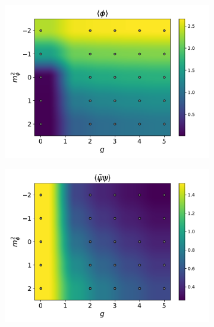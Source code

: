\begin{figure}[htp]
    \centering
    \begin{subfigure}[b]{0.47\textwidth}
        \includegraphics[width=\textwidth]{figures/phase_diagram/g-m/phase_diagram_phi.pdf}
    \end{subfigure}
    \begin{subfigure}[b]{0.47\textwidth}
        \includegraphics[width=\textwidth]{figures/phase_diagram/g-m/phase_diagram_cond.pdf}
    \end{subfigure}
    \begin{subfigure}[b]{0.47\textwidth}

\end{subfigure}
\end{figure}
